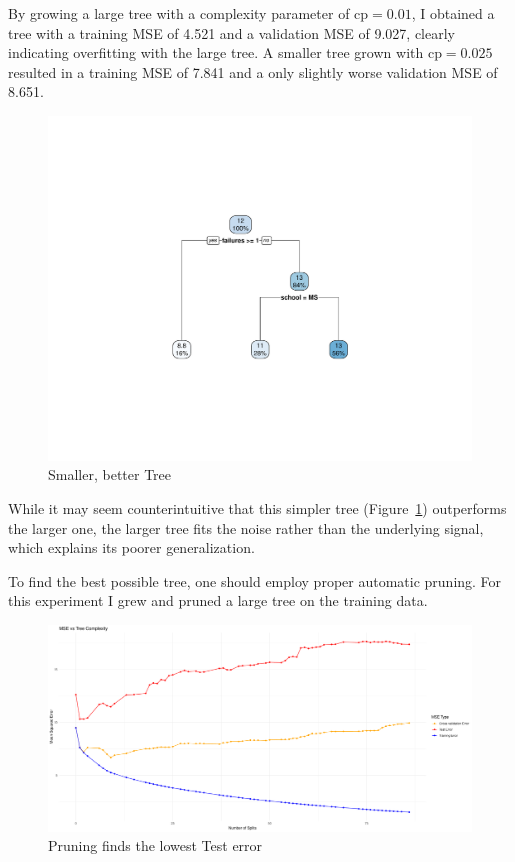 \documentclass[12pt]{article}
\begin{document}
By growing a large tree with a complexity parameter of \( \text{cp} = 0.01 \), I obtained a tree with a training MSE of 4.521 and a validation MSE of 9.027, clearly indicating overfitting with the large tree. A smaller tree grown with \( \text{cp} = 0.025 \) resulted in a training MSE of 7.841 and a only slightly worse validation MSE of 8.651.

\begin{figure}
    \centering
    \includegraphics[scale=0.30]{small_manual_tree.pdf}
    \caption{Smaller, better Tree}
    \label{small_tree}
\end{figure}

While it may seem counterintuitive that this simpler tree (Figure~\ref{small_tree}) outperforms the larger one, the larger tree fits the noise rather than the underlying signal, which explains its poorer generalization.





To find the best possible tree, one should employ proper automatic pruning. For this experiment I grew and pruned a large tree on the training data.

\begin{figure}
    \centering
    \includegraphics[scale=0.30]{triple_pruning_plot.pdf}
    \caption{Pruning finds the lowest Test error}
    \label{prune}
\end{figure}
\end{document}
